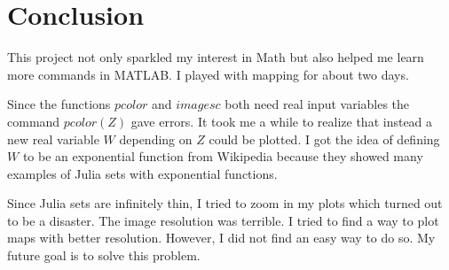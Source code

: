 \documentclass[11pt]{article}
\begin{document}
\section{Conclusion}

This project not only sparkled my interest in Math but also helped me learn more commands in MATLAB. I played with mapping for about two days.

Since the functions $pcolor$ and $imagesc$ both need real input variables the command $pcolor(Z)$ gave errors. It took me a while to realize that instead a new real variable $W$ depending on $Z$ could be plotted. I got the idea of defining $W$ to be an exponential function from Wikipedia because they showed many examples of Julia sets with exponential functions.

Since Julia sets are infinitely thin, I tried to zoom in my plots which turned out to be a disaster. The image resolution was terrible. I tried to find a way to plot maps with better resolution. However, I did not find an easy way to do so. My future goal is to solve this problem.

\end{document}
